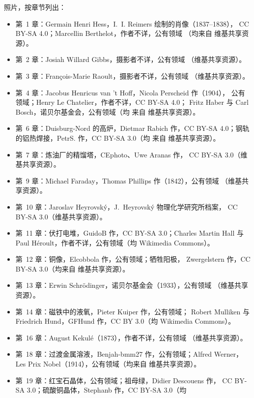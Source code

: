 \bigskip
\noindent 照片，按章节列出：
\begin{itemize}\small
  \item 第~1 章：Germain Henri Hess，I.~I. Reimers 绘制的肖像（1837--1838），
        CC BY-SA 4.0；Marcellin Berthelot，作者不详，公有领域
        （均来自 维基共享资源）。
  \item 第~2 章：Josiah Willard Gibbs，摄影者不详，公有领域
        （维基共享资源）。
  \item 第~3 章：François-Marie Raoult，摄影者不详，公有领域
        （维基共享资源）。
  \item 第~4 章：Jacobus Henricus van 't Hoff，Nicola Perscheid 作（1904），
        公有领域；Henry Le Chatelier，作者不详，CC BY-SA 4.0；
        Fritz Haber 与 Carl Bosch，诺贝尔基金会，公有领域（均
        来自 维基共享资源）。
  \item 第~6 章：Duisburg-Nord 的高炉，Dietmar Rabich 作，CC BY-SA
        4.0；钢轨的铝热焊接，PetrS. 作，CC BY-SA 3.0（均
        来自 维基共享资源）。
  \item 第~7 章：炼油厂的精馏塔，CEphoto、Uwe Aranas 作，
        CC BY-SA 3.0（维基共享资源）。
  \item 第~9 章：Michael Faraday，Thomas Phillips 作（1842），公有领域
        （维基共享资源）。
  \item 第~10 章：Jaroslav Heyrovsk\'y，J.~Heyrovsk\'y 物理化学研究所档案，
        CC BY-SA 3.0（维基共享资源）。
  \item 第~11 章：伏打电堆，GuidoB 作，CC BY-SA 3.0；Charles Martin Hall
        与 Paul H\'eroult，作者不详，公有领域（均 Wikimedia
        Commons）。
  \item 第~12 章：铜像，Elcobbola 作，公有领域；牺牲阳极，
        Zwergelstern 作，CC BY-SA 3.0（均来自 维基共享资源）。
  \item 第~13 章：Erwin Schr\"odinger，诺贝尔基金会（1933），公有领域
        （维基共享资源）。
  \item 第~14 章：磁铁中的液氧，Pieter Kuiper 作，公有领域；
        Robert Mulliken 与 Friedrich Hund，GFHund 作，CC BY 3.0（均 Wikimedia
        Commons）。
  \item 第~16 章：August Kekul\'e（1873），作者不详，公有领域
        （维基共享资源）。
  \item 第~18 章：过渡金属溶液，Benjah-bmm27 作，公有领域；Alfred
        Werner，Les Prix Nobel（1914），公有领域（均来自 维基共享资源）。
  \item 第~19 章：红宝石晶体，公有领域；祖母绿，Didier Descouens 作，
        CC BY-SA 3.0；硫酸铜晶体，Stephanb 作，CC BY-SA 3.0（均

\end{itemize}
